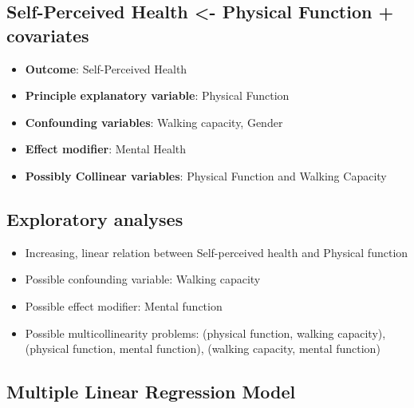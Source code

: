 \documentclass[
]{book}
\providecommand{\tightlist}{%
  \setlength{\itemsep}{0pt}\setlength{\parskip}{0pt}}
\begin{document}
\hypertarget{self-perceived-health---physical-function-covariates}{%
\subsection{Self-Perceived Health \textless- Physical Function + covariates}\label{self-perceived-health---physical-function-covariates}}

\begin{itemize}
\tightlist
\item
  \textbf{Outcome}: Self-Perceived Health
\item
  \textbf{Principle explanatory variable}: Physical Function
\item
  \textbf{Confounding variables}: Walking capacity, Gender
\item
  \textbf{Effect modifier}: Mental Health
\item
  \textbf{Possibly Collinear variables}: Physical Function and Walking Capacity
\end{itemize}

\hypertarget{exploratory-analyses}{%
\subsection{Exploratory analyses}\label{exploratory-analyses}}

\begin{itemize}
\tightlist
\item
  Increasing, linear relation between Self-perceived health and Physical function
\item
  Possible confounding variable: Walking capacity
\item
  Possible effect modifier: Mental function
\item
  Possible multicollinearity problems: (physical function, walking capacity), (physical function, mental function), (walking capacity, mental function)
\end{itemize}

\hypertarget{multiple-linear-regression-model}{%
\subsection{Multiple Linear Regression Model}\label{multiple-linear-regression-model}}
\end{document}

